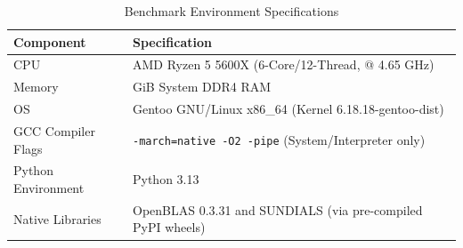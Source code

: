 \begin{table}[H]
\centering
\renewcommand{\arraystretch}{1.2}
\caption{Benchmark Environment Specifications}
\label{tab:hardware_specs}
\begin{tabularx}{\textwidth}{@{} l >{\raggedright\arraybackslash}X @{}}
\toprule
\textbf{Component} & \textbf{Specification} \\ 
\midrule
CPU & AMD Ryzen 5 5600X (6-Core/12-Thread, @ 4.65 GHz) \\
Memory & 32 GiB System DDR4 RAM \\
OS & Gentoo GNU/Linux x86\_64 (Kernel 6.18.18-gentoo-dist) \\
GCC Compiler Flags & \texttt{-march=native -O2 -pipe} (System/Interpreter only) \\
Python Environment & Python 3.13 \\
Native Libraries & OpenBLAS 0.3.31 and SUNDIALS (via pre-compiled PyPI wheels) \\
\bottomrule
\end{tabularx}
\end{table}
